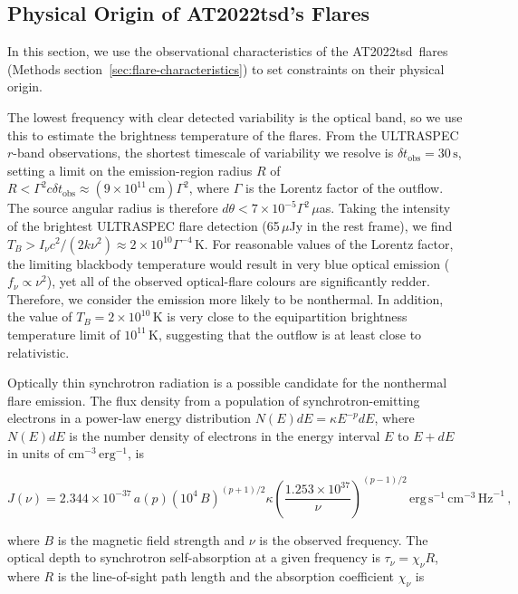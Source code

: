\documentclass{nature_plusfigure}
\newcommand{\at}{AT2022tsd}
\begin{document}
\begin{methods}
\section{Physical Origin of \at's Flares}
\label{sec:flare-origin}

In this section, we use the observational characteristics of the \at\ flares (Methods section~\ref{sec:flare-characteristics}) to set constraints on their physical origin.

The lowest frequency with clear detected variability is the optical band, so we use this to estimate the brightness temperature of the flares.
From the ULTRASPEC $r$-band observations, the shortest timescale of variability we resolve is $\delta t_\mathrm{obs} = 30\,\mathrm{s}$, setting a limit on the emission-region radius $R$ of $R<\Gamma^2 c \delta t_\mathrm{obs} \approx (9\times10^{11}\,\mathrm{cm}) \Gamma^2$, where $\Gamma$ is the Lorentz factor of the outflow. 
The source angular radius is therefore $d\theta < 7 \times 10^{-5} \Gamma^2 \,\mu$as. Taking the intensity of the brightest ULTRASPEC flare detection (65\,$\mu$Jy in the rest frame), we find $T_B > I_\nu c^2/(2 k\nu^2) \approx 2\times10^{10} \Gamma^{-4} \,$K.
For reasonable values of the Lorentz factor,
the limiting blackbody temperature would result in very blue optical emission ($f_\nu\propto\nu^2$), yet all of the observed optical-flare colours are significantly redder.
Therefore, we consider the emission more likely to be nonthermal.
In addition, the value of $T_B=2\times10^{10}\,$K is very close to the equipartition brightness temperature limit\cite{Readhead1994} of $10^{11}$\,K, suggesting that the outflow is at least close to relativistic. 

Optically thin synchrotron radiation is a possible candidate for the nonthermal flare emission. The flux density from a population of synchrotron-emitting electrons in a power-law energy distribution $N(E)dE = \kappa E^{-p} dE$, where $N(E)dE$ is the number density of electrons in the energy interval $E$ to $E+dE$ in units of $\mathrm{cm}^{-3}\,\mathrm{erg}^{-1}$, is\cite{Longair2011}

\begin{equation}
\label{eq:synchrotron-flux}
    J(\nu) = 2.344\times10^{-37}\, a(p) (10^4\,B)^{(p+1)/2} \kappa \left( \frac{1.253\times10^{37}}{\nu} \right)^{(p-1)/2}\,\mathrm{erg}\,\mathrm{s}^{-1}\,\mathrm{cm}^{-3}\,\mathrm{Hz}^{-1}\,,
\end{equation}

\noindent where $B$ is the magnetic field strength and $\nu$ is the observed frequency. The optical depth to synchrotron self-absorption at a given frequency is $\tau_\nu = \chi_\nu R$, where $R$ is the line-of-sight path length and the absorption coefficient $\chi_\nu$ is


\end{methods}
\end{document}
